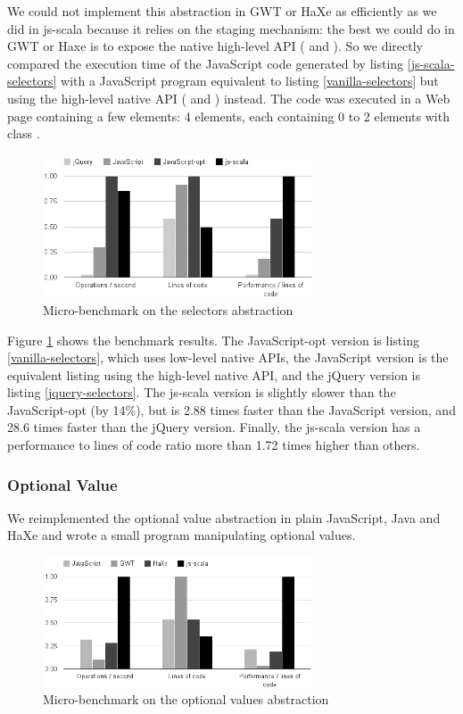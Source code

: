 \documentclass[preprint]{sigplanconf}
\begin{document}
We could not implement this abstraction in GWT or HaXe as efficiently as we did in js-scala because
it relies on the staging mechanism: the best we could do in GWT or Haxe is to expose the native
high-level API ( and ). So we directly compared the
execution time of the JavaScript code generated by listing \ref{js-scala-selectors} with a
JavaScript program equivalent to listing \ref{vanilla-selectors} but using the high-level native
API ( and ) instead. The code was executed in a Web page
containing a few elements: 4  elements, each containing 0 to 2 elements with class
.

\begin{figure}
\centering
\includegraphics[width=8cm]{selectors-benchmark.png}
\caption{Micro-benchmark on the selectors abstraction}
\label{fig:selectors-benchmark}
\end{figure}

Figure \ref{fig:selectors-benchmark} shows the benchmark results. The JavaScript-opt version is
listing \ref{vanilla-selectors}, which uses low-level native APIs, the JavaScript version is the
equivalent listing using the high-level native API, and the jQuery version is listing
\ref{jquery-selectors}. The js-scala version is slightly slower than the JavaScript-opt (by 14\%),
but is 2.88 times faster than the JavaScript version, and 28.6 times faster than the jQuery
version. Finally, the js-scala version has a performance to lines of code ratio more than 1.72
times higher than others.

\subsubsection{Optional Value}

We reimplemented the optional value abstraction in plain JavaScript, Java and HaXe and wrote a small
program manipulating optional values.

\begin{figure}
\centering
\includegraphics[width=8cm]{microbenchmark.png}
\caption{Micro-benchmark on the optional values abstraction}
\label{micro-benchmark}
\end{figure}
\end{document}
